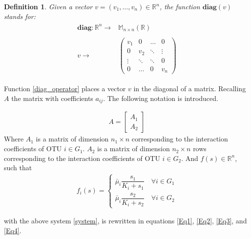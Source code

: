 \documentclass[3p,times]{article}
\newcommand{\R}{\mathbb{R}}
\newcommand{\diag}{\textbf{diag}}
\newtheorem{defn}{Definition}
\begin{document}
\begin{defn} Given a vector $v=(v_1,\dots, v_n)\in \R^n$, the function $\diag(v)$ stands for:
	\begin{align}
	\begin{array}{rc}
	\diag:\R^n \rightarrow & \mathbb{M}_{n\times n}(\R)\\
	& \\
	v \rightarrow & \begin{pmatrix}
	v_1 & 0 & \dots & 0 \\
	0 & v_2 & \ddots & \vdots\\ 
	\vdots & \ddots & \ddots& 0 \\
	0 & \dots &0 & v_n 
	\end{pmatrix}
	\end{array} \label{diag_operator}
	\end{align}
\end{defn}

Function \eqref{diag_operator} places a vector $v$ in the diagonal of a matrix. Recalling $A$ the matrix with coefficients $a_{ij}$. The following notation is introduced.

\begin{align} A = \begin{bmatrix}
A_1\\A_2
\end{bmatrix}\end{align}
 Where $A_1$ is a matrix of dimension $n_1 \times n$ corresponding to the interaction coefficients of OTU $i \in G_1$. $A_2$ is a matrix of dimension $n_2 \times n$ rows corresponding to the interaction coefficients of OTU $i \in G_2$.
And  $f(s) \in \R^n$, such that 
\begin{align}
f_i(s) = \begin{cases}
\bar{\mu}_i \dfrac{s_1}{K_i + s_1} \quad \forall i \in G_1 \\
\bar{\mu}_i \dfrac{s_2}{K_i + s_2} \quad \forall i \in G_2
\end{cases}
\end{align}

with the above system \eqref{system}, is rewritten in equations \eqref{Eq1}, \eqref{Eq2}, \eqref{Eq3}, and \eqref{Eq4}. 
\end{document}
